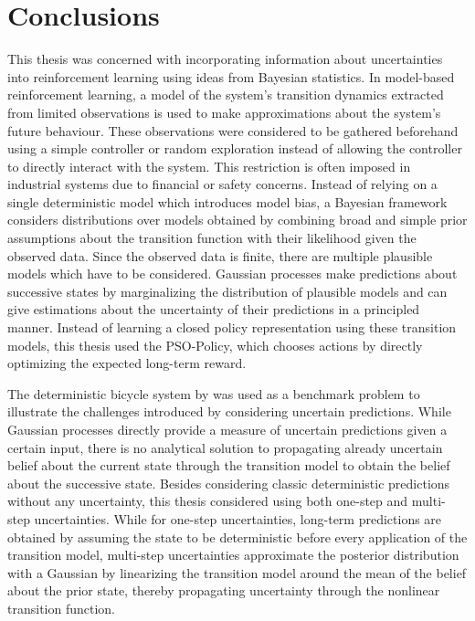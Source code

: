 \chapter{Conclusions}
This thesis was concerned with incorporating information about uncertainties into reinforcement learning using ideas from Bayesian statistics.
In model-based reinforcement learning, a model of the system's transition dynamics extracted from limited observations is used to make approximations about the system's future behaviour.
These observations were considered to be gathered beforehand using a simple controller or random exploration instead of allowing the controller to directly interact with the system.
This restriction is often imposed in industrial systems due to financial or safety concerns.
Instead of relying on a single deterministic model which introduces model bias, a Bayesian framework considers distributions over models obtained by combining broad and simple prior assumptions about the transition function with their likelihood given the observed data.
Since the observed data is finite, there are multiple plausible models which have to be considered.
Gaussian processes make predictions about successive states by marginalizing the distribution of plausible models and can give estimations about the uncertainty of their predictions in a principled manner.
Instead of learning a closed policy representation using these transition models, this thesis used the PSO-Policy, which chooses actions by directly optimizing the expected long-term reward.

The deterministic bicycle system by \citeauthor{randlov_learning_1998} was used as a benchmark problem to illustrate the challenges introduced by considering uncertain predictions.
While Gaussian processes directly provide a measure of uncertain predictions given a certain input, there is no analytical solution to propagating already uncertain belief about the current state through the transition model to obtain the belief about the successive state.
Besides considering classic deterministic predictions without any uncertainty, this thesis considered using both one-step and multi-step uncertainties.
While for one-step uncertainties, long-term predictions are obtained by assuming the state to be deterministic before every application of the transition model, multi-step uncertainties approximate the posterior distribution with a Gaussian by linearizing the transition model around the mean of the belief about the prior state, thereby propagating uncertainty through the nonlinear transition function.

